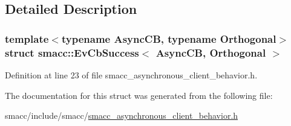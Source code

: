 \subsection{Detailed Description}
\subsubsection*{template$<$typename Async\+CB, typename Orthogonal$>$\newline
struct smacc\+::\+Ev\+Cb\+Success$<$ Async\+C\+B, Orthogonal $>$}



Definition at line 23 of file smacc\+\_\+asynchronous\+\_\+client\+\_\+behavior.\+h.



The documentation for this struct was generated from the following file\+:\begin{DoxyCompactItemize}
\item 
smacc/include/smacc/\hyperlink{smacc__asynchronous__client__behavior_8h}{smacc\+\_\+asynchronous\+\_\+client\+\_\+behavior.\+h}\end{DoxyCompactItemize}
